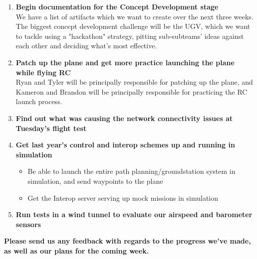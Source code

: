 \documentclass[]{../auvsi_doc}
\begin{document}
\begin{enumerate}
\item \textbf{Begin documentation for the Concept Development stage}\\
We have a list of artifacts which we want to create over the next three weeks. The biggest concept development challenge will be the UGV, which we want to tackle using a "hackathon" strategy, pitting sub-subteams' ideas against each other and deciding what's most effective.
\item \textbf{Patch up the plane and get more practice launching the plane while flying RC}\\
Ryan and Tyler will be principally responsible for patching up the plane, and Kameron and Brandon will be principally responsible for practicing the RC launch process.
\item \textbf{Find out what was causing the network connectivity issues at Tuesday's flight test}\\
\item \textbf{Get last year's control and interop schemes up and running in simulation}\\
\begin{itemize}
\item Be able to launch the entire path planning/groundstation system in simulation, and send waypoints to the plane
\item Get the Interop server serving up mock missions in simulation
\end{itemize}
\item \textbf{Run tests in a wind tunnel to evaluate our airspeed and barometer sensors}
\end{enumerate}

\textbf{Please send us any feedback with regards to the progress we've made, as well as our plans for the coming week.}
\end{document}
